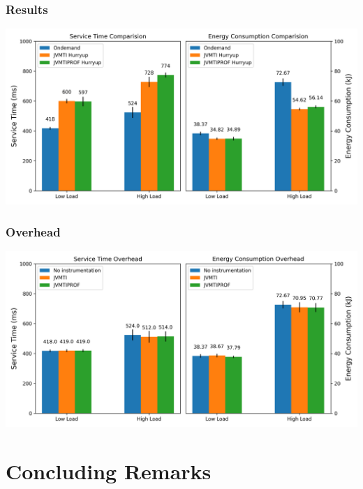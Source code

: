 \documentclass{beamer}
\begin{document}
\begin{frame}
\frametitle{Results}
\includegraphics[width=1.0\textwidth]{src/figure/ondem_vs_hup_vs_newhup.png}
\end{frame}

\begin{frame}
\frametitle{Overhead}
\includegraphics[width=1.0\textwidth]{src/figure/overhead.png}
\end{frame}

\section{Concluding Remarks}
\end{document}
